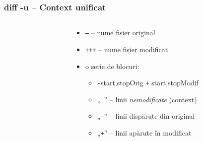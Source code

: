 \documentclass{beamer}
\begin{document}
\begin{frame}
  \frametitle{\textbf{diff -u} – Context unificat}
  \begin{columns}

    \begin{column}{6cm}
      \tt{}
    \end{column}

    \begin{column}{10cm}
      \begin{itemize}
      \item \texttt{\texttt{---}} – nume fișier original
      \item \texttt{\texttt{+++}} – nume fișier modificat
      \item o serie de blocuri:
        \begin{itemize}
          \item \footnotesize \texttt{-}start,stopOrig \texttt{+} start,stopModif
        \item „\texttt{ }” – linii \textit{nemodificate} (context)
        \item „\texttt{-}” – linii dispărute din original
        \item „\texttt{+}” – linii apărute în modificat
        \end{itemize}
      \end{itemize}
    \end{column}

  \end{columns}
\end{frame}
\end{document}
